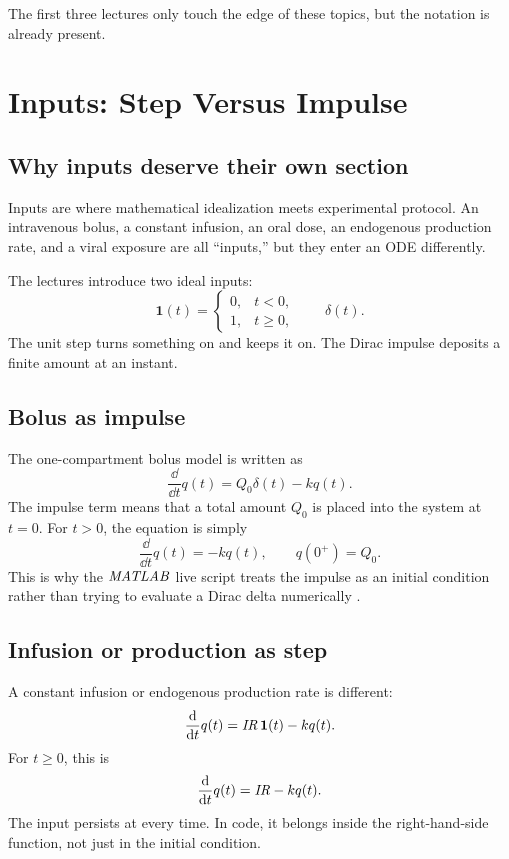 \documentclass[a4paper]{article}
\newcommand{\ddt}{\frac{\dd}{\dd t}}
\newcommand{\MATLAB}{\ensuremath{\pksym{MATLAB}}}
\newcommand{\IRate}{\ensuremath{\pksym{IR}}}
\newcommand{\unitstep}{\mathbf{1}(t)}
\newcommand{\dirac}{\delta(t)}
\begin{document}
The first three lectures only touch the edge of these topics, but the notation is already present.

\section{Inputs: Step Versus Impulse}

\subsection{Why inputs deserve their own section}

Inputs are where mathematical idealization meets experimental protocol. An intravenous bolus, a constant infusion, an oral dose, an endogenous production rate, and a viral exposure are all ``inputs,'' but they enter an ODE differently.

The lectures introduce two ideal inputs:
\[
  \unitstep =
  \begin{cases}
    0, & t<0,\\
    1, & t\ge 0,
  \end{cases}
  \qquad
  \dirac.
\]
The unit step turns something on and keeps it on. The Dirac impulse deposits a finite amount at an instant.

\subsection{Bolus as impulse}

The one-compartment bolus model is written as
\[
  \ddt q(t)=Q_0\dirac-kq(t).
\]
The impulse term means that a total amount \(Q_0\) is placed into the system at \(t=0\). For \(t>0\), the equation is simply
\[
  \ddt q(t)=-kq(t),\qquad q(0^+)=Q_0.
\]
This is why the \MATLAB{} live script treats the impulse as an initial condition rather than trying to evaluate a Dirac delta numerically \cite{bmeg671MatlabImpulse2025,bmeg671TranscriptAug292025}.

\subsection{Infusion or production as step}

A constant infusion or endogenous production rate is different:
\[
  \ddt q(t)=\IRate\,\unitstep-kq(t).
\]
For \(t\ge 0\), this is
\[
  \ddt q(t)=\IRate-kq(t).
\]
The input persists at every time. In code, it belongs inside the right-hand-side function, not just in the initial condition.
\end{document}
